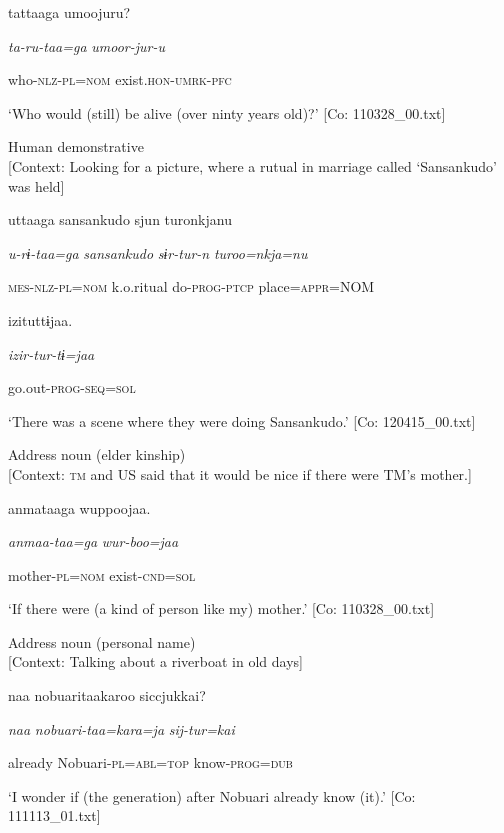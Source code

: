 {\US}
tattaaga  umoojuru?

      \textit{ta-ru-taa=ga}  \textit{umoor-jur-u}

      who-\textsc{nlz}-\textsc{pl}=\textsc{nom}  exist.\textsc{hon}-\textsc{umrk}-\textsc{pfc}

\glt ‘Who would (still) be alive (over ninty years old)?’ [Co: 110328\_00.txt]
\z

 \ex Human demonstrative\\{}
[Context: Looking for a picture, where a rutual in marriage called ‘Sansankudo’ was held]

{\TM}
\gll uttaaga  {\textbar}sansankudo{\textbar}  sjun  turonkjanu

      \textit{u-rɨ-taa=ga}  \textit{sansankudo}  \textit{sɨr-tur-n}  \textit{turoo=nkja=nu}

      \textsc{mes}-\textsc{nlz}-\textsc{pl}=\textsc{nom}  k.o.ritual  do-\textsc{prog}-\textsc{ptcp}  place=\textsc{appr}=NOM

      izituttɨjaa.

      \textit{izir-tur-tɨ=jaa}

      go.out-\textsc{prog}-\textsc{seq}=\textsc{sol}

\glt ‘There was a scene where they were doing Sansankudo.’ [Co: 120415\_00.txt]
\z

 \ex Address noun (elder kinship)\\{}
[Context: \textsc{tm} and US said that it would be nice if there were TM’s mother.]

{\TM}
\gll anmataaga  wuppoojaa.

      \textit{anmaa-taa=ga}  \textit{wur-boo=jaa}

      mother-\textsc{pl}=\textsc{nom}  exist-\textsc{cnd}=\textsc{sol}

\glt ‘If there were (a kind of person like my) mother.’ [Co: 110328\_00.txt]
\z

 \ex Address noun (personal name)\\{}
[Context: Talking about a riverboat in old days]

{\TM}
\gll naa  nobuaritaakaroo  siccjukkai?

      \textit{naa}  \textit{nobuari-taa=kara=ja}  \textit{sij-tur=kai}

      already  Nobuari-\textsc{pl}=\textsc{abl}=\textsc{top}  know-\textsc{prog}=\textsc{dub}

\glt ‘I wonder if (the generation) after Nobuari already know (it).’ [Co: 111113\_01.txt]
\z

